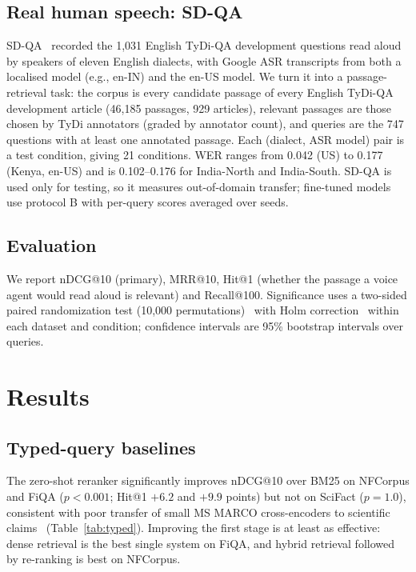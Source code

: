 \documentclass[conference]{IEEEtran}
\begin{document}
\subsection{Real human speech: SD-QA}
SD-QA~\cite{sdqa} recorded the 1,031 English TyDi-QA development questions read aloud by speakers of eleven English dialects, with Google ASR transcripts from both a localised model (e.g., en-IN) and the en-US model. We turn it into a passage-retrieval task: the corpus is every candidate passage of every English TyDi-QA development article (46,185 passages, 929 articles), relevant passages are those chosen by TyDi annotators (graded by annotator count), and queries are the 747 questions with at least one annotated passage. Each (dialect, ASR model) pair is a test condition, giving 21 conditions. WER ranges from 0.042 (US) to 0.177 (Kenya, en-US) and is 0.102--0.176 for India-North and India-South. SD-QA is used only for testing, so it measures out-of-domain transfer; fine-tuned models use protocol B with per-query scores averaged over seeds.

\subsection{Evaluation}
We report nDCG@10 (primary), MRR@10, Hit@1 (whether the passage a voice agent would read aloud is relevant) and Recall@100. Significance uses a two-sided paired randomization test (10,000 permutations)~\cite{smucker} with Holm correction~\cite{holm} within each dataset and condition; confidence intervals are 95\% bootstrap intervals over queries.

\section{Results}
\subsection{Typed-query baselines}
The zero-shot reranker significantly improves nDCG@10 over BM25 on NFCorpus and FiQA ($p<0.001$; Hit@1 $+6.2$ and $+9.9$ points) but not on SciFact ($p=1.0$), consistent with poor transfer of small MS MARCO cross-encoders to scientific claims~\cite{rosa} (Table~\ref{tab:typed}). Improving the first stage is at least as effective: dense retrieval is the best single system on FiQA, and hybrid retrieval followed by re-ranking is best on NFCorpus.
\end{document}
